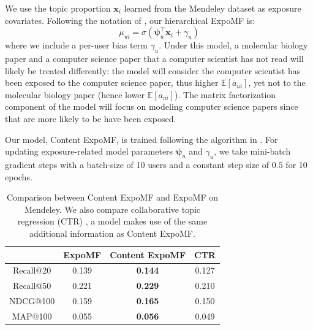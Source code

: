 We use the topic proportion $\mathbf{x}_i$ learned from the Mendeley dataset as
exposure covariates. Following the notation of , our
hierarchical ExpoMF is:
\begin{displaymath} \mu_{ui}= \sigma(\boldsymbol\psi_u^\top \mathbf{x}_i + \gamma_u)\end{displaymath}
where we include a per-user bias term $\gamma_u$. Under this model, a
molecular biology paper and a computer science paper that a computer
scientist has not read will likely be treated differently: the model will
consider the computer scientist has been exposed to the computer science
paper, thus higher $\mathbb{E}[a_{ui}]$, yet not to the molecular biology
paper (hence lower $\mathbb{E}[a_{ui}]$). The matrix factorization
component of the model will focus on modeling computer science papers
since that are more likely to be have been exposed. 

Our model, Content ExpoMF, is trained following the algorithm in
. For updating exposure-related model parameters
$\boldsymbol\psi_{u}$ and $\gamma_u$, we take mini-batch gradient steps with a
batch-size of 10 users and a constant step size of $0.5$ for 10 epochs.

\begin{table}
\centering
\begin{tabular}{ c c c c}
\hline
            & ExpoMF & Content ExpoMF & CTR \cite{wang2011collaborative} \\ \hline
  Recall@20 & 0.139 & \textbf{0.144}         & 0.127 \\ 
  Recall@50 & 0.221 & \textbf{0.229}         & 0.210 \\ 
  NDCG@100  & 0.159 & \textbf{0.165}         & 0.150 \\ 
  MAP@100   & 0.055 & \textbf{0.056}        & 0.049 \\ 
\hline 
\end{tabular}
\caption{Comparison between Content ExpoMF and ExpoMF on Mendeley. We also compare collaborative topic regression (CTR) \cite{wang2011collaborative}, a model makes use of the same additional information as Content ExpoMF. }
\label{tab:si_doc_results}
\end{table}



